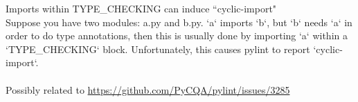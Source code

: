 Imports within TYPE\_CHECKING can induce ``cyclic-import" \\
Suppose you have two modules: a.py and b.py.  `a` imports `b`, but `b` needs `a` in order to do type annotations, then this is usually done by importing `a` within a `TYPE\_CHECKING` block.  Unfortunately, this causes pylint to report `cyclic-import`. \\
\\
Possibly related to \url{https://github.com/PyCQA/pylint/issues/3285}
